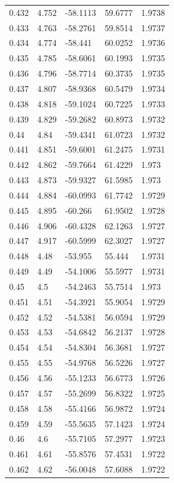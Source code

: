 \begin{tabular}{lllll}
0.432 & 4.752 & -58.1113 & 59.6777 & 1.9738 \\
0.433 & 4.763 & -58.2761 & 59.8514 & 1.9737 \\
0.434 & 4.774 & -58.441 & 60.0252 & 1.9736 \\
0.435 & 4.785 & -58.6061 & 60.1993 & 1.9735 \\
0.436 & 4.796 & -58.7714 & 60.3735 & 1.9735 \\
0.437 & 4.807 & -58.9368 & 60.5479 & 1.9734 \\
0.438 & 4.818 & -59.1024 & 60.7225 & 1.9733 \\
0.439 & 4.829 & -59.2682 & 60.8973 & 1.9732 \\
0.44 & 4.84 & -59.4341 & 61.0723 & 1.9732 \\
0.441 & 4.851 & -59.6001 & 61.2475 & 1.9731 \\
0.442 & 4.862 & -59.7664 & 61.4229 & 1.973 \\
0.443 & 4.873 & -59.9327 & 61.5985 & 1.973 \\
0.444 & 4.884 & -60.0993 & 61.7742 & 1.9729 \\
0.445 & 4.895 & -60.266 & 61.9502 & 1.9728 \\
0.446 & 4.906 & -60.4328 & 62.1263 & 1.9727 \\
0.447 & 4.917 & -60.5999 & 62.3027 & 1.9727 \\
0.448 & 4.48 & -53.955 & 55.444 & 1.9731 \\
0.449 & 4.49 & -54.1006 & 55.5977 & 1.9731 \\
0.45 & 4.5 & -54.2463 & 55.7514 & 1.973 \\
0.451 & 4.51 & -54.3921 & 55.9054 & 1.9729 \\
0.452 & 4.52 & -54.5381 & 56.0594 & 1.9729 \\
0.453 & 4.53 & -54.6842 & 56.2137 & 1.9728 \\
0.454 & 4.54 & -54.8304 & 56.3681 & 1.9727 \\
0.455 & 4.55 & -54.9768 & 56.5226 & 1.9727 \\
0.456 & 4.56 & -55.1233 & 56.6773 & 1.9726 \\
0.457 & 4.57 & -55.2699 & 56.8322 & 1.9725 \\
0.458 & 4.58 & -55.4166 & 56.9872 & 1.9724 \\
0.459 & 4.59 & -55.5635 & 57.1423 & 1.9724 \\
0.46 & 4.6 & -55.7105 & 57.2977 & 1.9723 \\
0.461 & 4.61 & -55.8576 & 57.4531 & 1.9722 \\
0.462 & 4.62 & -56.0048 & 57.6088 & 1.9722 \\

\end{tabular}
